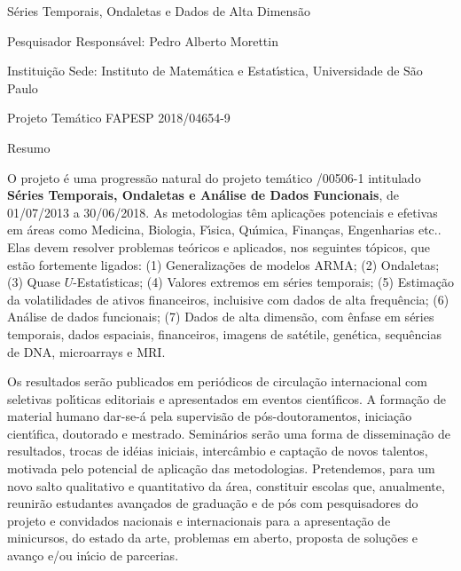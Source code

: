 \documentclass[11pt]{article}
\begin{document}
\vspace{1cm}
\thispagestyle{empty}

\begin{center}
{\huge S\'eries Temporais, Ondaletas e  Dados de Alta Dimens\~ao
\vspace*{1cm}
{\sf }
}

{\sc Pesquisador Respons\'avel: Pedro Alberto Morettin}

\vspace{1cm}

Institui\c c\~ao Sede: Instituto de Matem\'atica e Estat\'\i stica, Universidade de S\~ao Paulo

\vspace{.5cm}

Projeto Tem\'atico FAPESP 2018/04654-9

\vspace{1cm}

{\sc Resumo}

\end{center}

O projeto \'e uma progress\~ao natural do projeto tem\'atico {/00506-1} intitulado {\bf S\'eries Temporais, Ondaletas e An\'alise de Dados Funcionais}, de 01/07/2013 a 30/06/2018. As metodologias t\^em aplica\c c\~oes potenciais e efetivas em \'areas como Medicina, Biologia, F\'\i sica, Qu\'\i mica, Finan\c cas, Engenharias etc.. Elas devem resolver problemas te\'oricos e aplicados, nos seguintes t\'opicos, que est\~ao fortemente ligados: (1) Generaliza\c{c}\~oes de modelos ARMA; (2) Ondaletas; (3) Quase $U$-Estat\'{\i}sticas; (4) Valores extremos em s\'eries temporais; (5) Estima\c c\~ao da volatilidades de ativos financeiros, incluisive com dados de alta frequ\^encia; (6) An\'alise de dados funcionais; (7) Dados de alta dimens\~ao, com \^enfase em s\'eries temporais, dados espaciais, financeiros, imagens de sat\'etile, gen\'etica, sequ\^encias de DNA, microarrays e MRI.

Os resultados ser\~ao publicados em peri\'odicos de circula\c{c}\~ao internacional com se\-le\-ti\-vas pol\'{\i}ticas editoriais e apresentados em eventos cient\'{\i}ficos. A forma\c{c}\~ao de ma\-te\-rial humano dar-se-\'a pela supervis\~ao de p\'os-doutoramentos, inicia\c{c}\~ao cient\'{\i}fica, doutorado e mestrado. Semin\'arios ser\~ao uma forma de dissemina\c{c}\~ao de resultados, trocas de id\'eias iniciais, interc\^ambio e capta\c{c}\~ao de novos talentos, motivada pelo po\-ten\-cial de aplica\c{c}\~ao das metodologias. Pretendemos, para um novo salto qualitativo e quan\-ti\-ta\-ti\-vo da \'area, constituir escolas que, anualmente, reunir\~ao estudantes avan\c{c}ados de gradua\c{c}\~ao e de p\'os com pesquisadores do projeto e convida\-dos nacionais e internacionais para a apresenta\c{c}\~ao de minicursos, do estado da arte, problemas em aberto, proposta de solu\c{c}\~oes e avan\c{c}o e/ou in\'{\i}cio de parcerias. 
\end{document}
